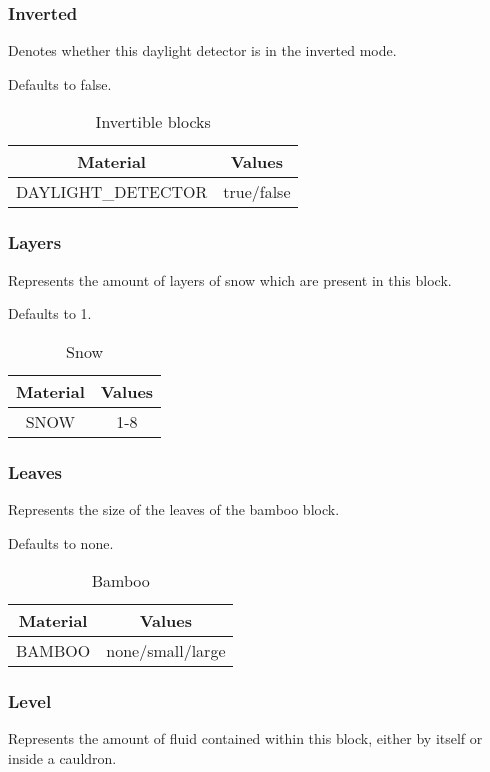 \subsubsection{Inverted}\label{spigot-types:inverted}
Denotes whether this daylight detector is in the inverted mode.

Defaults to false.

\begin{table}[H]
	\centering
	\begin{tabular}{ |c|c| }
		\hline
		Material & Values \\
		\hline
		DAYLIGHT\_DETECTOR & true/false \\
		\hline
	\end{tabular}
	\caption{Invertible blocks}
\end{table}

\subsubsection{Layers}
Represents the amount of layers of snow which are present in this block.

Defaults to 1.

\begin{table}[H]
	\centering
	\begin{tabular}{ |c|c| }
		\hline
		Material & Values \\
		\hline
		SNOW & 1-8 \\
		\hline
	\end{tabular}
	\caption{Snow}
\end{table}

\subsubsection{Leaves}\label{spigot-types:leaves}
Represents the size of the leaves of the bamboo block.

Defaults to none.

\begin{table}[H]
	\centering
	\begin{tabular}{ |c|c| }
		\hline
		Material & Values \\
		\hline
		BAMBOO & none/small/large \\
		\hline
	\end{tabular}
	\caption{Bamboo}
\end{table}

\subsubsection{Level}
Represents the amount of fluid contained within this block, either by itself or inside a cauldron.

